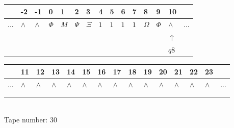 \documentclass[11pt]{article}
\begin{document}
\begin{table}[H]
\centering
\begin{tabular}{lllllllllllllll}
 & -2 & -1 & 0 & 1 & 2 & 3 & 4 & 5 & 6 & 7 & 8 & 9 & 10 & \\
\hline
$...$ & \multicolumn{1}{|l|}{$\wedge$} & \multicolumn{1}{|l|}{$\wedge$} & \multicolumn{1}{|l|}{$\Phi$} & \multicolumn{1}{|l|}{$M$} & \multicolumn{1}{|l|}{$\Psi$} & \multicolumn{1}{|l|}{$\Xi$} & \multicolumn{1}{|l|}{$1$} & \multicolumn{1}{|l|}{$1$} & \multicolumn{1}{|l|}{$1$} & \multicolumn{1}{|l|}{$1$} & \multicolumn{1}{|l|}{$\Omega$} & \multicolumn{1}{|l|}{$\Phi$} & \multicolumn{1}{|l|}{$\wedge$} & $...$\\
\hline
&  &  &  &  &  &  &  &  &  &  &  &  & $\uparrow$ &  \\
&  &  &  &  &  &  &  &  &  &  &  &  & $ q8 $ &  \\
\end{tabular}
\begin{tabular}{lllllllllllllll}
 & 11 & 12 & 13 & 14 & 15 & 16 & 17 & 18 & 19 & 20 & 21 & 22 & 23 & \\
\hline
$...$ & \multicolumn{1}{|l|}{$\wedge$} & \multicolumn{1}{|l|}{$\wedge$} & \multicolumn{1}{|l|}{$\wedge$} & \multicolumn{1}{|l|}{$\wedge$} & \multicolumn{1}{|l|}{$\wedge$} & \multicolumn{1}{|l|}{$\wedge$} & \multicolumn{1}{|l|}{$\wedge$} & \multicolumn{1}{|l|}{$\wedge$} & \multicolumn{1}{|l|}{$\wedge$} & \multicolumn{1}{|l|}{$\wedge$} & \multicolumn{1}{|l|}{$\wedge$} & \multicolumn{1}{|l|}{$\wedge$} & \multicolumn{1}{|l|}{$\wedge$} & $...$\\
\hline
&  &  &  &  &  &  &  &  &  &  &  &  &  &  \\
&  &  &  &  &  &  &  &  &  &  &  &  &  &  \\
\end{tabular}
\\
Tape number: 30
\noindent\makebox[\linewidth]{\hdashrule{\textwidth}{1pt}{1pt}}\end{table}
\end{document}
